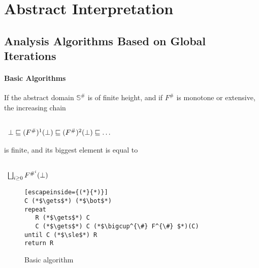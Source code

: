 \chapter{Abstract Interpretation}
\label{chap:ai}



\section{Analysis Algorithms Based on Global Iterations}
\label{sec:global-iterations}

\subsubsection{Basic Algorithms}
\label{sec:basic-algorithm}

If the abstract domain $\mathbb{S}^{\#}$ is of finite height, and if
$F^{\#}$ is monotone or extensive, the increasing chain

\begin{math}
  \begin{array}{c}
    \\
    \bot \sqsubseteq (F^{\#})^1(\bot) \sqsubseteq (F^{\#})^2(\bot) \sqsubseteq \dots
    \\
  \end{array}
\end{math}

is finite, and its biggest element is equal to

\begin{math}
  \begin{array}{c}
    \\
    \bigsqcup_{i \geq 0} F^{{\#}^{i}} (\bot)
    \\
  \end{array}
\end{math}


\begin{figure}[h]
  \centering
  \begin{lstlisting}[escapeinside={(*}{*)}]
C (*$\gets$*) (*$\bot$*)
repeat
   R (*$\gets$*) C
   C (*$\gets$*) C (*$\bigcup^{\#} F^{\#} $*)(C)
until C (*$\sle$*) R
return R

  \end{lstlisting}
  \caption{Basic algorithm}
  \label{fig:basic}
\end{figure}


